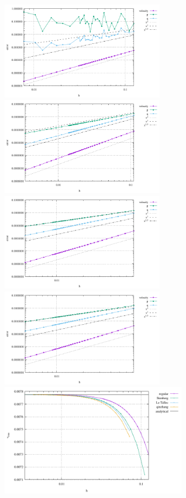 \begin{center}
\includegraphics[width=7cm]{python_codes/fieldstone_78/results/mms/errors_regular.pdf}
\includegraphics[width=7cm]{python_codes/fieldstone_78/results/mms/errors_stenberg.pdf}\\
\includegraphics[width=7cm]{python_codes/fieldstone_78/results/mms/errors_letallec.pdf}
\includegraphics[width=7cm]{python_codes/fieldstone_78/results/mms/errors_qinzhang.pdf}\\
\includegraphics[width=8cm]{python_codes/fieldstone_78/results/mms/vrms.pdf}
\end{center}

